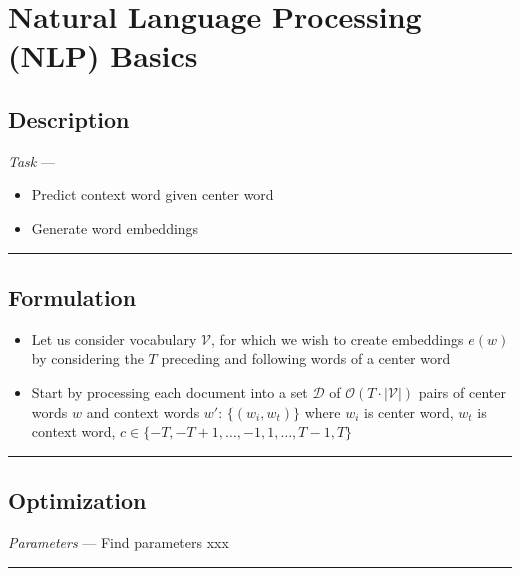 \section{Natural Language Processing (NLP) Basics}
\subsection*{Description}
\emph{Task} --- 
\begin{itemize}
    \item Predict context word given center word
    \item Generate word embeddings
\end{itemize}

{\color{black}\hrule height 0.001mm}

\subsection*{Formulation}

\begin{itemize}
    \item Let us consider vocabulary $\mathcal{V}$, for which we wish to create embeddings $e(w)$ by considering the $T$ preceding and following words of a center word
    \item Start by processing each document into a set $\mathcal{D}$ of $\mathcal{O}(T \cdot |\mathcal{V}|)$ pairs of center words $w$ and context words $w'$:
    $
    \{(w_i, w_t)\}
    $
    where $w_i$ is center word, $w_t$ is context word, $c \in \{-T, -T+1, \dots, -1, 1, \dots, T-1, T\}$
\end{itemize}

{\color{black}\hrule height 0.001mm}

\subsection*{Optimization}
\emph{Parameters} --- Find parameters xxx

{\color{lightgray}\hrule height 0.001mm}

